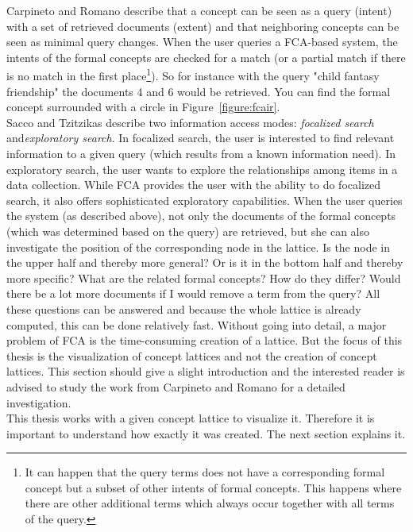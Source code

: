 \documentclass[11pt]{report}
\begin{document}
Carpineto and Romano \cite{Carpineto2005} describe that a concept can be seen as a query (intent) with a set of retrieved documents (extent) and that neighboring concepts can be seen as minimal query changes. When the user queries a FCA-based system, the intents of the formal concepts are checked for a match (or a partial match if there is no match in the first place\footnote{It can happen that the query terms does not have a corresponding formal concept but a subset of other intents of formal concepts. This happens where there are other additional terms which always occur together with all terms of the query.}). So for instance with the query "child fantasy friendship" the documents 4 and 6 would be retrieved. You can find the formal concept surrounded with a circle in Figure~\ref{figure:fcair}.\\

Sacco and Tzitzikas \cite{Sacco2009} describe two information access modes: \textit{focalized search} and\textit{exploratory search}. In focalized search, the user is interested to find relevant information to a given query (which results from a known information need). In exploratory search, the user wants to explore the relationships among items in a data collection. While FCA provides the user with the ability to do focalized search, it also offers sophisticated exploratory capabilities. When the user queries the system (as described above), not only the documents of the formal concepts (which was determined based on the query) are retrieved, but she can also investigate the position of the corresponding node in the lattice. Is the node in the upper half and thereby more general? Or is it in the bottom half and thereby more specific? What are the related formal concepts? How do they differ? Would there be a lot more documents if I would remove a term from the query? All these questions can be answered and because the whole lattice is already computed, this can be done relatively fast. Without going into detail, a major problem of FCA is the time-consuming creation of a lattice. But the focus of this thesis is the visualization of concept lattices and not the creation of concept lattices. This section should give a slight introduction and the interested reader is advised to study the work from Carpineto and Romano \cite{carpineto2004concept} for a detailed investigation. \\

This thesis works with a given concept lattice to visualize it. Therefore it is important to understand how exactly it was created. The next section explains it.
\end{document}
